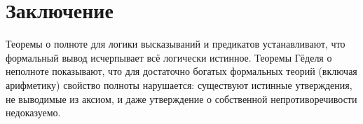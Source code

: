 \documentclass[10pt]{article}
\begin{document}
\section*{Заключение}
Теоремы о полноте для логики высказываний и предикатов устанавливают, что формальный вывод исчерпывает всё логически истинное. Теоремы Гёделя о неполноте показывают, что для достаточно богатых формальных теорий (включая арифметику) свойство полноты нарушается: существуют истинные утверждения, не выводимые из аксиом, и даже утверждение о собственной непротиворечивости недоказуемо.
\end{document}
